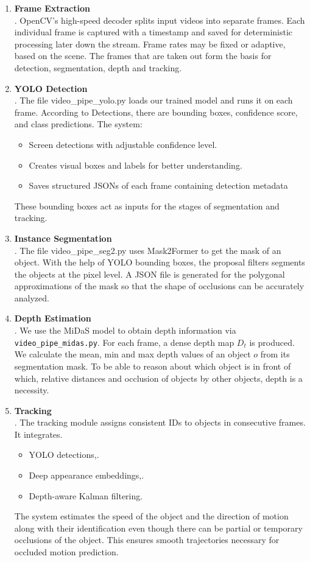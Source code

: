 \documentclass[12pt,a4paper]{report}
\theoremstyle{definition}
\theoremstyle{remark}
\begin{document}
\begin{enumerate}

\item \textbf{Frame Extraction}\\.
OpenCV’s high-speed decoder splits input videos into separate frames. Each individual frame is captured with a timestamp and saved for deterministic processing later down the stream. Frame rates may be fixed or adaptive, based on the scene. The frames that are taken out form the basis for detection, segmentation, depth and tracking. 

\item \textbf{YOLO Detection}\\.
The file video\_pipe\_yolo.py loads our trained model and runs it on each frame. According to Detections, there are bounding boxes, confidence score, and class predictions. The system:
    \begin{itemize}
        \item Screen detections with adjustable confidence level.
        \item Creates visual boxes and labels for better understanding.
        \item Saves structured JSONs of each frame containing detection metadata
    \end{itemize}
    These bounding boxes act as inputs for the stages of segmentation and tracking. 

    \item \textbf{Instance Segmentation}\\.
The file video\_pipe\_seg2.py uses Mask2Former to get the mask of an object. With the help of YOLO bounding boxes, the proposal filters segments the objects at the pixel level. A JSON file is generated for the polygonal approximations of the mask so that the shape of occlusions can be accurately analyzed.
\item \textbf{Depth Estimation}\\.
We use the MiDaS model to obtain depth information via \texttt{video\_pipe\_midas.py}. For each frame, a dense depth map $D_t$ is produced. We calculate the mean, min and max depth values of an object $o$ from its segmentation mask. To be able to reason about which object is in front of which, relative distances and occlusion of objects by other objects, depth is a necessity.

    \item \textbf{Tracking}\\.
The tracking module assigns consistent IDs to objects in consecutive frames. It integrates.
\begin{itemize}
\item YOLO detections,.
\item Deep appearance embeddings,.
\item Depth-aware Kalman filtering.
\end{itemize}
The system estimates the speed of the object and the direction of motion along with their identification even though there can be partial or temporary occlusions of the object. This ensures smooth trajectories necessary for occluded motion prediction.


\end{enumerate}
\end{document}
